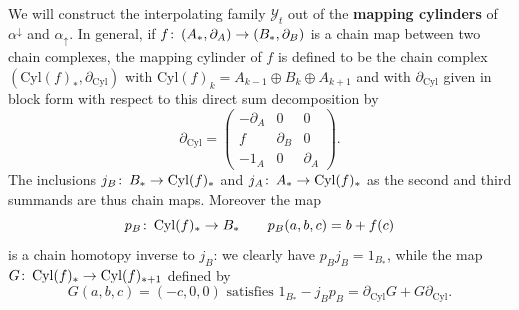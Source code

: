 \documentclass[11pt]{amsart}
\theoremstyle{definition}
\theoremstyle{remark}
\numberwithin{equation}{section}
\def\co{\colon\thinspace}
\begin{document}
We will construct the interpolating family $\mathcal{Y}_t$ out of the \textbf{mapping cylinders} of $\alpha^{\downarrow}$ and $\alpha_{\uparrow}$. In general, if 
$f\co (A_*,\partial_A)\to (B_*,\partial_B)$ is a chain map between two chain complexes, the mapping cylinder of $f$ is defined to be the chain complex
 $(\mathrm{Cyl}(f)_*,\partial_{\mathrm{Cyl}})$ with $ \mathrm{Cyl}(f)_k=A_{k-1}\oplus B_k\oplus A_{k+1}$ and with $\partial_{\mathrm{Cyl}}$ given in block form with respect to this direct sum decomposition by
	 \[ \partial_{\mathrm{Cyl}}=\left(\begin{array}{ccc} -\partial_{A} & 0 & 0 \\ f & \partial_B & 0 \\ -1_A & 0 & \partial_A    \end{array}\right). \] 
	  The inclusions  $j_B\co B_*\to \mathrm{Cyl}(f)_*$ and $j_A\co A_*\to\mathrm{Cyl}(f)_*$ as the second and third summands are thus chain maps.  Moreover the map
	   \begin{equation}  \label{pbdef} p_B\co \mathrm{Cyl}(f)_*\to B_* \qquad p_B(a,b,c)=b+f(c) \end{equation}
	    is a chain homotopy inverse to $j_B$: we clearly have $p_Bj_B=1_{B_*}$, while the map $G\co \mathrm{Cyl}(f)_*\to \mathrm{Cyl}(f)_{*+1}$ defined by
	 \begin{equation}\label{cylhtopy} G(a,b,c)=(-c,0,0)\mbox{ satisfies }1_{B_*}-j_Bp_B=\partial_{\mathrm{Cyl}}G+G\partial_{\mathrm{Cyl}}.\end{equation}
\end{document}
